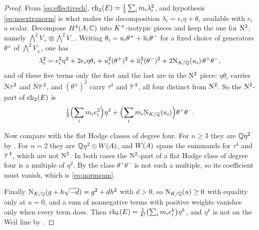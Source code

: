 \begin{proof}
From \eqref{eq:effectivech},
$\operatorname{ch}_{2}(E)=\tfrac12\sum_{i}m_{i}\lambda_{i}^{2}$, and hypothesis
\eqref{eq:noextranorm} is what makes the decomposition
$\lambda_{i}=e_{i}\eta+\theta_{i}$ available with $e_{i}$ a scalar. Decompose
$H^{4}(A,\mathbb{C})$ into $K^{\times}$-isotypic pieces and keep the one for $\mathrm{N}^{2}$,
namely $\bigwedge^{2}V_{+}\otimes\bigwedge^{2}V_{-}$. Writing
$\theta_{i}=u_{i}\theta^{+}+\overline{u}_{i}\theta^{-}$ for a fixed choice of
generators $\theta^{\pm}$ of $\bigwedge^{2}V_{\pm}$, one has
\[
  \lambda_{i}^{2}
  =e_{i}^{2}\eta^{2}
   +2e_{i}\eta\theta_{i}
   +u_{i}^{2}(\theta^{+})^{2}+\overline{u}_{i}^{2}(\theta^{-})^{2}
   +2\mathrm{N}_{K/\mathbb{Q}}(u_{i})\,\theta^{+}\theta^{-},
\]
and of these five terms only the first and the last are in the $\mathrm{N}^{2}$
piece: $\eta\theta_{i}$ carries $\mathrm{N}\tau^{2}$ and $\mathrm{N}\overline{\tau}^{\,2}$, and
$(\theta^{\pm})^{2}$ carry $\tau^{4}$ and $\overline{\tau}^{\,4}$, all four distinct
from $\mathrm{N}^{2}$. So the $\mathrm{N}^{2}$-part of $\operatorname{ch}_{2}(E)$ is
\[
  \tfrac12\Bigl(\sum_{i}m_{i}e_{i}^{2}\Bigr)\eta^{2}
  +\Bigl(\sum_{i}m_{i}\mathrm{N}_{K/\mathbb{Q}}(u_{i})\Bigr)\theta^{+}\theta^{-}.
\]

Now compare with the flat Hodge classes of degree four. For $n\ge3$ they are
$\mathbb{Q}\eta^{2}$ by . For $n=2$ they are
$\mathbb{Q}\eta^{2}\oplus W(A)$, and $W(A)$ spans the summands for $\tau^{4}$ and
$\overline{\tau}^{\,4}$, which are not $\mathrm{N}^{2}$. In both cases the $\mathrm{N}^{2}$-part
of a flat Hodge class of degree four is a multiple of $\eta^{2}$. By
 the class $\theta^{+}\theta^{-}$ is not such a multiple,
so its coefficient must vanish, which is \eqref{eq:normsum}.

Finally $\mathrm{N}_{K/\mathbb{Q}}(g+h\sqrt{-d})=g^{2}+dh^{2}$ with $d>0$, so
$\mathrm{N}_{K/\mathbb{Q}}(u)\ge0$ with equality only at $u=0$, and a sum of nonnegative
terms with positive weights vanishes only when every term does. Then
$\operatorname{ch}_{k}(E)=\frac{1}{k!}\bigl(\sum_{i}m_{i}e_{i}^{k}\bigr)\eta^{k}$, and
$\eta^{k}$ is not on the Weil line by .
\end{proof}

